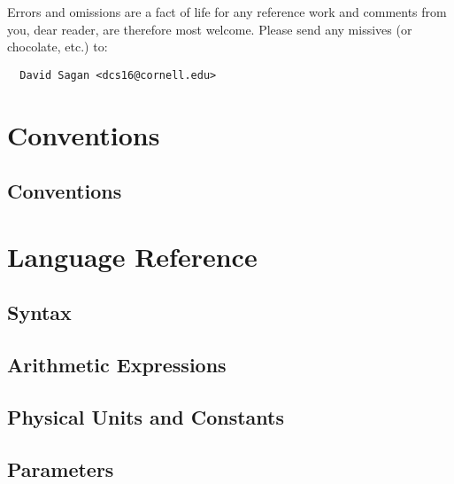\documentclass{book}
\begin{document}
Errors and omissions are a fact of life for any reference work and
comments from you, dear reader, are therefore most welcome. Please
send any missives (or chocolate, etc.) to:
\begin{verbatim}
  David Sagan <dcs16@cornell.edu>
\end{verbatim}


\tableofcontents

\listoffigures

\listoftables

\part{Conventions}

\chapter{Conventions}


\part{Language Reference}


\chapter{Syntax}

\chapter{Arithmetic Expressions}

\chapter{Physical Units and Constants}

\chapter{Parameters}
\end{document}
